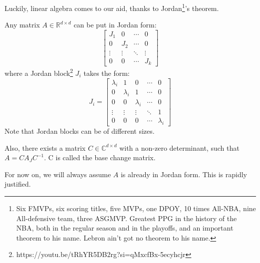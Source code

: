 Luckily, linear algebra comes to our aid, thanks to Jordan\footnote{Six FMVPs, six scoring titles, five MVPs, one DPOY, 10 times All-NBA, nine All-defensive team, three ASGMVP. Greatest PPG in the history of the NBA, both in the regular season and in the playoffs, and an important theorem to his name. Lebron ain't got no theorem to his name.}'s theorem.
\begin{theorem}
    Any matrix $A\in\mathbb{R}^{d\times d}$ can be put in Jordan form:
    \begin{equation*}
        \begin{bmatrix}
        J_1 & 0 & \cdots & 0 \\
        0 & J_2 & \cdots & 0 \\
        \vdots & \vdots & \ddots & \vdots \\
        0 & 0 & \cdots & J_k
        \end{bmatrix}
    \end{equation*}
    where a Jordan block\footnote{https://youtu.be/tRhYR5DB2rg?si=qMxcfBx-5ecyhcjr} $J_i$ takes the form: \begin{equation*}
        J_i = \begin{bmatrix}
        \lambda_i & 1 & 0 & \cdots & 0 \\
        0 & \lambda_i & 1 & \cdots & 0 \\
        0 & 0 & \lambda_i & \cdots & 0 \\
        \vdots & \vdots & \vdots & \ddots & 1 \\
        0 & 0 & 0 & \cdots & \lambda_i
        \end{bmatrix}
    \end{equation*}
    Note that Jordan blocks can be of different sizes.

    Also, there exists a matrix $C\in\mathbb{C}^{d\times d}$ with a non-zero determinant, such that $A=CA_JC^{-1}$. C is called the base change matrix.
\end{theorem}

For now on, we will always assume $A$ is already in Jordan form. This is rapidly justified.

